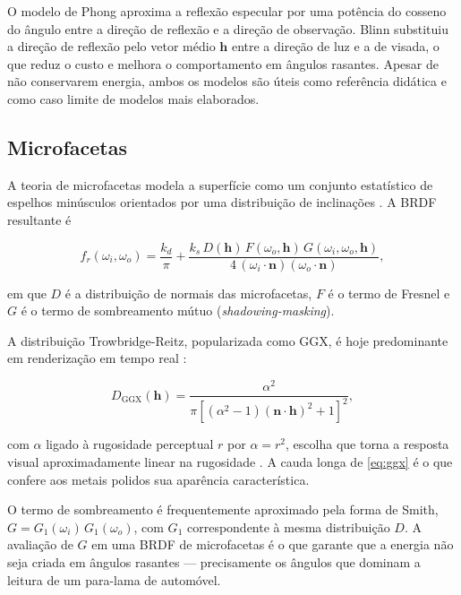 O modelo de Phong \cite{phong1975} aproxima a reflex\~ao especular por uma pot\^encia do cosseno
do \^angulo entre a dire\c{c}\~ao de reflex\~ao e a dire\c{c}\~ao de observa\c{c}\~ao. Blinn
\cite{blinn1977} substituiu a dire\c{c}\~ao de reflex\~ao pelo vetor m\'edio $\mathbf{h}$ entre
a dire\c{c}\~ao de luz e a de visada, o que reduz o custo e melhora o comportamento em
\^angulos rasantes. Apesar de n\~ao conservarem energia, ambos os modelos s\~ao \'uteis como
refer\^encia did\'atica e como caso limite de modelos mais elaborados.

\subsection{Microfacetas}

A teoria de microfacetas modela a superf\'icie como um conjunto estat\'istico de espelhos
min\'usculos orientados por uma distribui\c{c}\~ao de inclina\c{c}\~oes \cite{cook1982}. A BRDF
resultante \'e

\begin{equation}
f_r(\omega_i,\omega_o) = \frac{k_d}{\pi} + \frac{k_s\, D(\mathbf{h})\, F(\omega_o,\mathbf{h})\, G(\omega_i,\omega_o,\mathbf{h})}{4\,(\omega_i\cdot\mathbf{n})(\omega_o\cdot\mathbf{n})},
\label{eq:cook-torrance}
\end{equation}

\noindent em que $D$ \'e a distribui\c{c}\~ao de normais das microfacetas, $F$ \'e o termo de
Fresnel e $G$ \'e o termo de sombreamento m\'utuo (\emph{shadowing-masking}).

A distribui\c{c}\~ao Trowbridge-Reitz, popularizada como GGX, \'e hoje predominante em
renderiza\c{c}\~ao em tempo real \cite{walter2007, karis2013}:

\begin{equation}
D_{\mathrm{GGX}}(\mathbf{h}) = \frac{\alpha^2}{\pi\left[(\alpha^2-1)(\mathbf{n}\cdot\mathbf{h})^2 + 1\right]^2},
\label{eq:ggx}
\end{equation}

\noindent com $\alpha$ ligado \`a rugosidade perceptual $r$ por $\alpha = r^2$, escolha que
torna a resposta visual aproximadamente linear na rugosidade \cite{karis2013}. A cauda longa de
\eqref{eq:ggx} \'e o que confere aos metais polidos sua apar\^encia caracter\'istica.

O termo de sombreamento \'e frequentemente aproximado pela forma de Smith,
$G = G_1(\omega_i)\,G_1(\omega_o)$, com $G_1$ correspondente \`a mesma distribui\c{c}\~ao $D$.
A avalia\c{c}\~ao de $G$ em uma BRDF de microfacetas \'e o que garante que a energia n\~ao seja
criada em \^angulos rasantes --- precisamente os \^angulos que dominam a leitura de um
para-lama de autom\'ovel.

